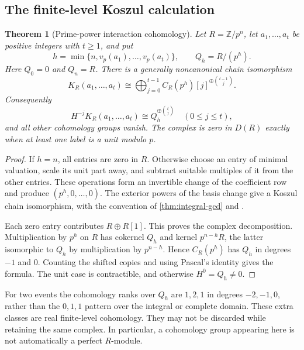 \documentclass[11pt]{article}
\newtheorem{theorem}{Theorem}[section]
\theoremstyle{definition}
\theoremstyle{remark}
\begin{document}
\subsection{The finite-level Koszul calculation}

\begin{theorem}[Prime-power interaction cohomology]\label{thm:prime-power-koszul}
Let $R=\mathbb Z/p^n$, let $a_1,\ldots,a_t$ be positive integers with $t\geq1$, and put
\[
 h=\min\{n,v_p(a_1),\ldots,v_p(a_t)\},\qquad Q_h=R/(p^h).
\]
Here $Q_0=0$ and $Q_n=R$. There is a generally noncanonical chain isomorphism
\[
 K_R(a_1,\ldots,a_t)\cong
 \bigoplus_{j=0}^{t-1}C_R(p^h)[j]^{\oplus\binom{t-1}{j}}.
\]
Consequently
\[
 \boxed{H^{-j}K_R(a_1,\ldots,a_t)\cong Q_h^{\oplus\binom tj}
 \quad(0\leq j\leq t),}
\]
and all other cohomology groups vanish. The complex is zero in $D(R)$ exactly when at least one label is a unit modulo $p$.
\end{theorem}
\begin{proof}
If $h=n$, all entries are zero in $R$. Otherwise choose an entry of minimal valuation, scale its unit part away, and subtract suitable multiples of it from the other entries. These operations form an invertible change of the coefficient row and produce $(p^h,0,\ldots,0)$. The exterior powers of the basis change give a Koszul chain isomorphism, with the convention of \cref{thm:integral-gcd} and \cite{StacksKoszul}.

Each zero entry contributes $R\oplus R[1]$. This proves the complex decomposition. Multiplication by $p^h$ on $R$ has cokernel $Q_h$ and kernel $p^{n-h}R$, the latter isomorphic to $Q_h$ by multiplication by $p^{n-h}$. Hence $C_R(p^h)$ has $Q_h$ in degrees $-1$ and $0$. Counting the shifted copies and using Pascal's identity gives the formula. The unit case is contractible, and otherwise $H^0=Q_h\ne0$.
\end{proof}

For two events the cohomology ranks over $Q_h$ are $1,2,1$ in degrees $-2,-1,0$, rather than the $0,1,1$ pattern over the integral or complete domain. These extra classes are real finite-level cohomology. They may not be discarded while retaining the same complex. In particular, a cohomology group appearing here is not automatically a perfect $R$-module.
\end{document}
